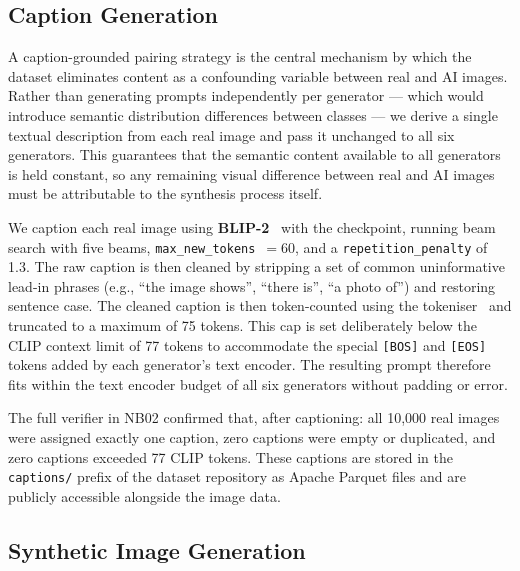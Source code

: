 \subsection{Caption Generation}
\label{ssec:captions}

A caption-grounded pairing strategy is the central mechanism by which
the dataset eliminates content as a confounding variable between real
and AI images.
Rather than generating prompts independently per generator — which
would introduce semantic distribution differences between classes — we
derive a single textual description from each real image and pass it
unchanged to all six generators.
This guarantees that the semantic content available to all generators
is held constant, so any remaining visual difference between real and
AI images must be attributable to the synthesis process itself.

We caption each real image using
\textbf{BLIP-2}~\cite{li2023blip2} with the
 checkpoint, running beam search
with five beams, \texttt{max\_new\_tokens}~$= 60$, and a
\texttt{repetition\_penalty} of 1.3.
The raw caption is then cleaned by stripping a set of common
uninformative lead-in phrases (e.g., ``the image shows'', ``there is'',
``a photo of'') and restoring sentence case.
The cleaned caption is then token-counted using the
 tokeniser~\cite{radford2021clip}
and truncated to a maximum of 75 tokens.
This cap is set deliberately below the CLIP context limit of 77 tokens
to accommodate the special \texttt{[BOS]} and \texttt{[EOS]} tokens
added by each generator's text encoder.
The resulting prompt therefore fits within the text encoder budget of
all six generators without padding or error.

The full verifier in NB02 confirmed that, after captioning:
all 10,000 real images were assigned exactly one caption,
zero captions were empty or duplicated, and
zero captions exceeded 77 CLIP tokens.
These captions are stored in the \texttt{captions/} prefix of the
dataset repository as Apache Parquet files and are publicly accessible
alongside the image data.

\subsection{Synthetic Image Generation}
\label{ssec:generation}

